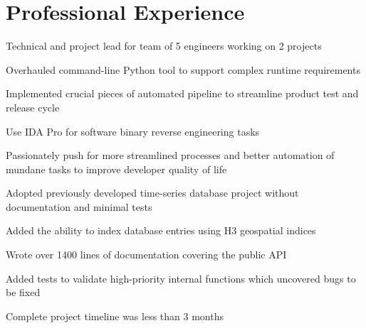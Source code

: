 \documentclass[letterpaper]{deedy-resume}
\newcommand{\experiencespace}{\vspace{2em}}
\begin{document}
\begin{minipage}[t]{0.66\textwidth} %

	\section{Professional Experience}
	\begin{compactitem}
        \item Technical and project lead for team of 5 engineers working on 2 projects
        \item Overhauled command-line Python tool to support complex runtime requirements
        \item Implemented crucial pieces of automated pipeline to streamline product test and release cycle
        \item Use IDA Pro for software binary reverse engineering tasks
        \item Passionately push for more streamlined processes and better automation of mundane tasks to
            improve developer quality of life
	\end{compactitem}
    \experiencespace

	\begin{compactitem}
        \item Adopted previously developed time-series database project without documentation and minimal tests
        \item Added the ability to index database entries using H3 geospatial indices
        \item Wrote over 1400 lines of documentation covering the public API
        \item Added tests to validate high-priority internal functions which uncovered bugs to be fixed
        \item Complete project timeline was less than 3 months
	\end{compactitem}
    \experiencespace


\end{minipage}
\end{document}
